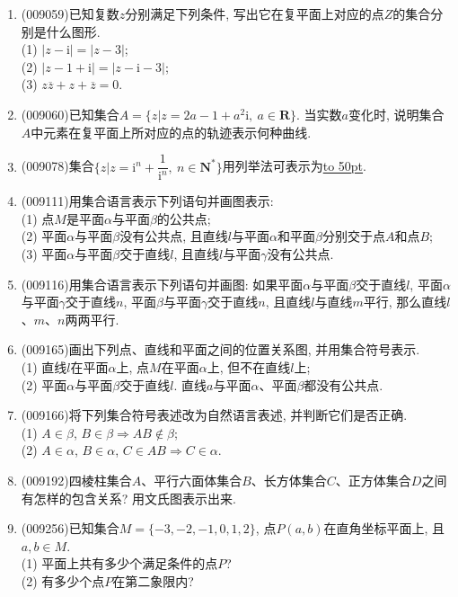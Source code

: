 \documentclass[10pt,a4paper]{article}
\newcommand{\blank}[1]{\underline{\hbox to #1pt{}}}
\begin{document}
\begin{enumerate}[1.]
\item {\tiny (009059)}已知复数$z$分别满足下列条件, 写出它在复平面上对应的点$Z$的集合分别是什么图形.\\
(1) $|z-\mathrm{i}|=|z-3|$;\\ 
(2) $|z-1+\mathrm{i}|=|z-\mathrm{i}-3|$;\\
(3) $z\overline z+z+\overline z=0$.
\item {\tiny (009060)}已知集合$A=\{z|z=2a-1+a^2\mathrm{i},\ a\in \mathbf{R}\}$. 当实数$a$变化时, 说明集合$A$中元素在复平面上所对应的点的轨迹表示何种曲线.
\item {\tiny (009078)}集合$\{z|z=\mathrm{i}^n+\dfrac 1{\mathrm{i}^n}, \ n\in \mathbf{N}^*\}$用列举法可表示为\blank{50}.
\item {\tiny (009111)}用集合语言表示下列语句并画图表示:\\
(1) 点$M$是平面$\alpha$与平面$\beta$的公共点;\\
(2) 平面$\alpha$与平面$\beta$没有公共点, 且直线$l$与平面$\alpha$和平面$\beta$分别交于点$A$和点$B$;\\
(3) 平面$\alpha$与平面$\beta$交于直线$l$, 且直线$l$与平面$\gamma$没有公共点.
\item {\tiny (009116)}用集合语言表示下列语句并画图:
如果平面$\alpha$与平面$\beta$交于直线$l$, 平面$\alpha$与平面$\gamma$交于直线$n$, 平面$\beta$与平面$\gamma$交于直线$n$, 且直线$l$与直线$m$平行, 那么直线$l$、$m$、$n$两两平行.
\item {\tiny (009165)}画出下列点、直线和平面之间的位置关系图, 并用集合符号表示.\\
(1) 直线$l$在平面$\alpha$上, 点$M$在平面$\alpha$上, 但不在直线$l$上;\\
(2) 平面$\alpha$与平面$\beta$交于直线$l$. 直线$a$与平面$\alpha$、平面$\beta$都没有公共点.
\item {\tiny (009166)}将下列集合符号表述改为自然语言表述, 并判断它们是否正确.\\
(1) $A\in \beta$, $B\in \beta \Rightarrow AB\not\in \beta$;\\
(2) $A\in \alpha$, $B\in \alpha$, $C\in AB\Rightarrow C\in \alpha$.
\item {\tiny (009192)}四棱柱集合$A$、平行六面体集合$B$、长方体集合$C$、正方体集合$D$之间有怎样的包含关系? 用文氏图表示出来.
\item {\tiny (009256)}已知集合$M=\{-3,-2,-1,0,1,2\}$, 点$P(a,b) $在直角坐标平面上, 且$a, b\in M$.\\
(1) 平面上共有多少个满足条件的点$P$?\\
(2) 有多少个点$P$在第二象限内?\\

\end{enumerate}
\end{document}
